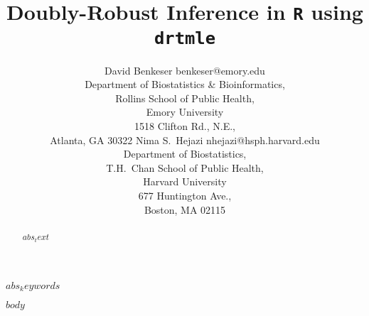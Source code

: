 \documentclass[twoside,11pt]{article}
\begin{document}
\title{Doubly-Robust Inference in \texttt{R} using \texttt{drtmle}}

\author{%
  \name David Benkeser \email benkeser@emory.edu\\
  \addr Department of Biostatistics \& Bioinformatics,\\
  Rollins School of Public Health,\\
  Emory University\\
  1518 Clifton Rd., N.E.,\\
  Atlanta, GA 30322
  \AND
  \name Nima S.~Hejazi \email nhejazi@hsph.harvard.edu\\
  \addr Department of Biostatistics,\\
  T.H.~Chan School of Public Health,\\
  Harvard University\\
  677 Huntington Ave.,\\
  Boston, MA 02115
}

\maketitle

\begin{abstract}
$abs_text$
\end{abstract}

\begin{keywords}
$abs_keywords$
\end{keywords}

$body$
\end{document}
